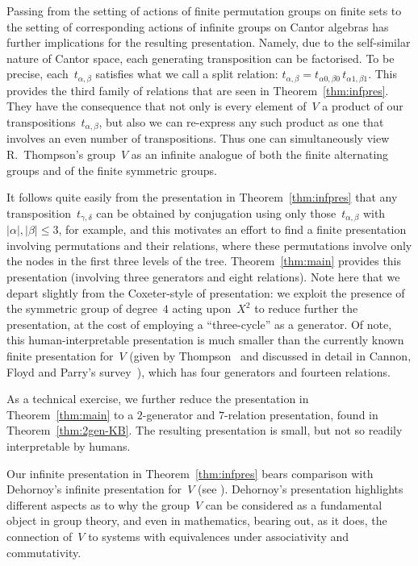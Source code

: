 \documentclass[a4paper,11pt]{article}
\numberwithin{equation}{section}
\newcommand{\length}[1]{\mathopen{|}#1\mathclose{|}}
\newcommand{\nbd}{\nobreakdash-}
\renewcommand{\leq}{\leqslant}
\begin{document}
Passing from the setting of actions of finite permutation groups on
finite sets to the setting of corresponding actions of infinite groups
on Cantor algebras has further implications for the resulting
presentation.  Namely, due to the self-similar nature of Cantor space,
each generating transposition can be factorised.  To be precise,
each~$t_{\alpha,\beta}$ satisfies what we call a split relation:
$t_{\alpha,\beta} = t_{\alpha0,\beta0} \, t_{\alpha1,\beta1}$.  This
provides the third family of relations that are seen in
Theorem~\ref{thm:infpres}.  They have the consequence that not only is
every element of~$V$ a product of our
transpositions~$t_{\alpha,\beta}$, but also we can re-express any such
product as one that involves an even number of transpositions.  Thus
one can simultaneously view R.~Thompson's group~$V$ as an infinite
analogue of both the finite alternating groups and of the finite
symmetric groups.

It follows quite easily from the presentation in
Theorem~\ref{thm:infpres} that any transposition~$t_{\gamma,\delta}$
can be obtained by conjugation using only those~$t_{\alpha,\beta}$
with $\length{\alpha},\length{\beta} \leq 3$, for example, and this
motivates an effort to find a finite presentation involving
permutations and their relations, where these permutations involve
only the nodes in the first three levels of the tree.
Theorem~\ref{thm:main} provides this presentation (involving three
generators and eight relations).  Note here that we depart slightly
from the Coxeter-style of presentation: we exploit the presence of the
symmetric group of degree~$4$ acting upon~$X^{2}$ to reduce further
the presentation, at the cost of employing a ``three-cycle'' as a
generator.  Of note, this human-interpretable presentation is much
smaller than the currently known finite presentation for~$V$ (given by
Thompson~\cite{ThompsonNotes} and discussed in detail in Cannon, Floyd
and Parry's survey~\cite{CFP}), which has four generators and fourteen
relations.

As a technical exercise, we further reduce the presentation in
Theorem~\ref{thm:main} to a $2$\nbd generator and $7$\nbd relation
presentation, found in Theorem~\ref{thm:2gen-KB}.  The resulting
presentation is small, but not so readily interpretable by humans.

Our infinite presentation in Theorem~\ref{thm:infpres} bears
comparison with Dehornoy's infinite presentation for~$V$ (see
\cite[Proposition~3.20]{Dehornoy}).  Dehornoy's presentation
highlights different aspects as to why the group~$V$ can be considered
as a fundamental object in group theory, and even in mathematics,
bearing out, as it does, the connection of~$V$ to systems with
equivalences under associativity and commutativity.  
\end{document}
